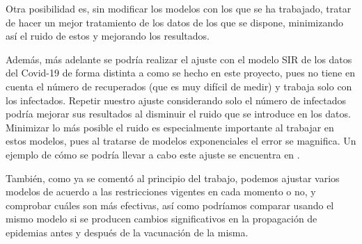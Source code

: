 Otra posibilidad es, sin modificar los modelos con los que se ha trabajado, tratar de hacer un mejor tratamiento de los datos de los que se dispone, minimizando así el ruido de estos y mejorando los resultados.

Además, más adelante se podría realizar el ajuste con el modelo SIR de los datos del Covid-19 de forma distinta a como se hecho en este proyecto, pues no tiene en cuenta el número de recuperados (que es muy difícil de medir) y trabaja solo con los infectados. Repetir nuestro ajuste considerando solo el número de infectados podría mejorar sus resultados al disminuir el ruido que se introduce en los datos. Minimizar lo más posible el ruido es especialmente importante al trabajar en estos modelos, pues al tratarse de modelos exponenciales el error se magnifica. Un ejemplo de cómo se podría llevar a cabo este ajuste se encuentra en \cite{enrique_amaro}.

También, como ya se comentó al principio del trabajo, podemos ajustar varios modelos de acuerdo a las restricciones vigentes en cada momento o no, y comprobar cuáles son más efectivas, así como podríamos comparar usando el mismo modelo si se producen cambios significativos en la propagación de epidemias antes y después de la vacunación de la misma.








